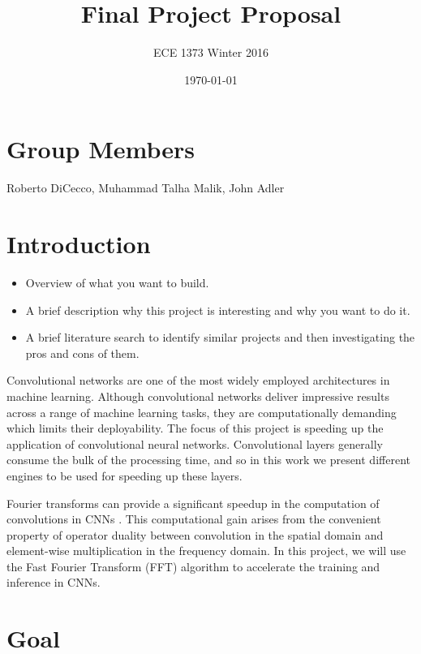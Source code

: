 \documentclass[conference,compsoc]{IEEEtran/IEEEtran}
\title{\bf Final Project Proposal}
\author{ECE 1373 Winter 2016}
\date{\today}
\begin{document}
\maketitle

\section{Group Members}
Roberto DiCecco, Muhammad Talha Malik, John Adler

\section{Introduction}\label{section:intro}
\begin{itemize}
\item Overview of what you want to build.
\item A brief description why this project is interesting and why you want to do it.
\item A brief literature search to identify similar projects and then investigating the pros and cons of them.
\end{itemize}

Convolutional networks are one of the most widely employed architectures in machine learning. Although convolutional networks deliver impressive results across a range of machine learning tasks, they are computationally demanding which limits their deployability. The focus of this project is speeding up the application of convolutional neural networks. Convolutional layers generally consume the bulk of the processing time, and so in this work we present different engines to be used for speeding up these layers.


Fourier transforms can provide a significant speedup in the computation of convolutions in CNNs \cite{FFT1, FFT2}. This computational gain arises from the convenient property of operator duality between convolution in the spatial domain and element-wise multiplication in the frequency domain. In this project, we will use the Fast Fourier Transform (FFT) algorithm to accelerate the training and inference in CNNs.


\section{Goal}\label{section:goal}
\end{document}
